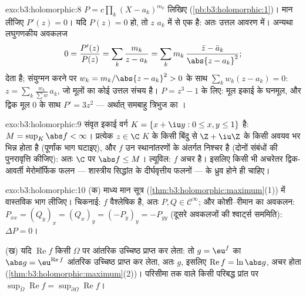 \begin{solution}{exo:b3:holomorphic:8}
$P = c\prod_k(X - a_k)^{m_k}$ लिखिए (\cref{pb:b3:holomorphic:1})। मान लीजिए $P'(z) = 0$। यदि $P(z) = 0$ हो, तो $z$ $a_k$
में से एक है: अतः उत्तल आवरण में। अन्यथा लघुगणकीय अवकलज
\[
0 = \frac{P'(z)}{P(z)} = \sum_k\frac{m_k}{z - a_k}
= \sum_k m_k\,\frac{\bar z - \bar a_k}{\abs{z - a_k}^2} ;
\]
देता है; संयुग्मन करने पर $w_k = m_k/\abs{z -
a_k}^2 > 0$ के साथ $\sum_kw_k(z - a_k) = 0$: $z = \sum_k\frac{w_k}{\sum w}\,a_k$, जो मूलों का कोई
उत्तल संचय है। $P = z^3 - 1$ के लिए: मूल इकाई के घनमूल, और द्विक मूल $0$
के साथ $P' = 3z^2$ --- अर्थात् समबाहु त्रिभुज का ।
\end{solution}

\begin{solution}{exo:b3:holomorphic:9}
संवृत इकाई वर्ग $K = \{x + \iu y : 0 \leq x, y \leq
1\}$  है: $M = \sup_K\abs f < \infty$। प्रत्येक $z \in \C$ $K$ के किसी
बिंदु से $\Z + \iu\Z$ के किसी अवयव भर भिन्न होता है (पूर्णांक भाग घटाइए),
और $f$ उन स्थानांतरणों के अंतर्गत निश्चर है (दोनों संबंधों की
पुनरावृत्ति कीजिए): अतः $\C$ पर $\abs f \leq M$। ल्यूविल: $f$ अचर है। इसलिए
किसी भी अचरेतर द्विक-आवर्ती मेरोमॉर्फिक फलन --- शास्त्रीय सिद्धांत
के दीर्घवृत्तीय फलनों --- के ध्रुव होने ही चाहिए।
\end{solution}

\begin{solution}{exo:b3:holomorphic:10}
(क) माध्य मान सूत्र (\cref{thm:b3:holomorphic:maximum}(1)) में वास्तविक भाग लीजिए। चिकनाई: $f$
वैश्लेषिक है, अतः $P, Q \in \mathcal C^\infty$; और कोशी--रीमान का अवकलन: $P_{xx} = (Q_y)_x = (Q_x)_y = (-P_y)_y =
-P_{yy}$ (दूसरे अवकलजों
की श्वार्ट्स सममिति): $\Delta P =
0$।

(ख) यदि $\operatorname{Re}f$ किसी  $\Omega$ पर आंतरिक उच्चिष्ठ प्राप्त कर लेता:
तो $g = \eu^f$ का $\abs g =
\eu^{\operatorname{Re}f}$ आंतरिक उच्चिष्ठ प्राप्त कर लेता, अतः $g$, इसलिए
$\operatorname{Re}f = \ln\abs g$, अचर होता (\cref{thm:b3:holomorphic:maximum}(2))। परिसीमा तक  वाले किसी परिबद्ध
प्रांत पर $\sup_{\bar\Omega}\operatorname{Re}f =
\sup_{\partial\Omega}\operatorname{Re}f$।
\end{solution}

